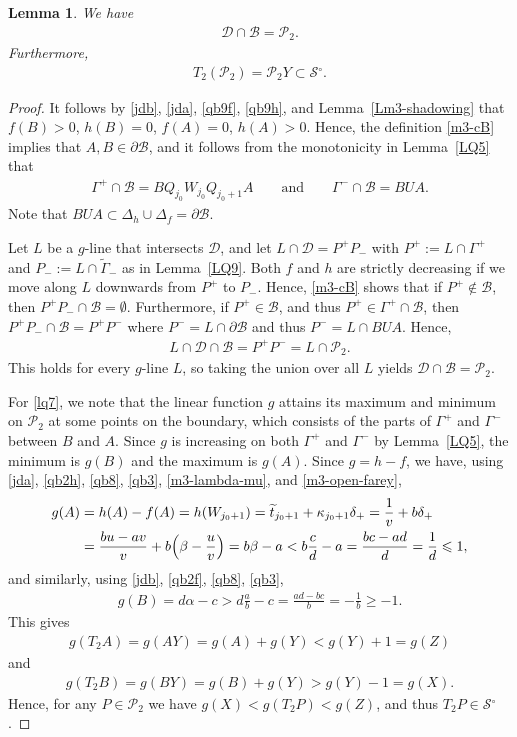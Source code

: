 \documentclass[11pt,reqno,tbtags,a4paper]{amsart}
\numberwithin{equation}{section}
\renewcommand\le{\leq}
\renewcommand\ge{\geq}
\renewcommand\leq{\leqslant}
\renewcommand\geq{\geqslant}
\theoremstyle{plain}%
\newtheorem{lemma}[theorem]{Lemma}
\theoremstyle{definition}
\theoremstyle{remark}
\newcommand{\refL}[1]{Lemma~\ref{#1}}
\newcommand\Bigpar[1]{\Bigl(#1\Bigr)}
\newcommand\inter{\ensuremath{^\circ}}
\newcommand\ga{\alpha}
\newcommand\gb{\beta}
\newcommand\gD{\Delta}
\newcommand\gG{\Gamma}
\newcommand\kk{\kappa}
\newcommand\cB{\mathcal B}
\newcommand\cD{\mathcal D}
\newcommand\cP{\mathcal P}
\newcommand\cS{{\mathcal S}}
\newcommand\tgG{\widetilde{\gG}}
\newcommand\ttt{\widetilde t}
\newcommand\0{{\boldsymbol 0}}
\newcommand\1{{\boldsymbol 1}}
\begin{document}
\begin{lemma}\label{LQ7}
  We have 
  \begin{align}\label{lq70}
\cD\cap\cB = \cP_2.
  \end{align}
Furthermore, 
  \begin{align}\label{lq7}
T_2(\cP_2)=\cP_2Y\subset\cS\inter.    
  \end{align}
\end{lemma}
\begin{proof}
It follows by \eqref{jdb}, \eqref{jda}, \eqref{qb9f}, \eqref{qb9h}, and 
\refL{Lm3-shadowing} that $f(B)>0$, $h(B)=0$, $f(A)=0$, $h(A)>0$.
Hence, the definition \eqref{m3-cB} implies that
$A,B\in\partial\cB$, and it follows from the monotonicity in \refL{LQ5}
that
\begin{align}\label{lq77}
  \gG^+\cap\cB=B Q_{j_0} W_{j_0} Q_{j_0+1} A
\qquad\text{and}\qquad
  \gG^-\cap\cB=B U A.
\end{align}
Note that $BUA \subset \gD_h\cup\gD_f=\partial\cB$.

Let $L$ be a $g$-line that intersects $\cD$, and let $L\cap\cD=P^+P_-$ with
$P^+:=L\cap\gG^+$ and
$P_-:=L\cap\tgG_-$ as in \refL{LQ9}.
Both $f$ and $h$ are strictly decreasing if we move along $L$
downwards from $P^+$ to $P_-$. 
Hence, \eqref{m3-cB} shows that if $P^+\notin\cB$, then
$P^+P_-\cap\cB=\emptyset$. Furthermore, if $P^+\in\cB$, 
and thus $P^+\in\gG^+\cap\cB$, 
then $P^+P_-\cap\cB=P^+P^-$ where $P^-=L\cap\partial\cB$
and thus $P^-=L\cap BUA$. Hence, 
\begin{align}\label{qd1}
L\cap\cD\cap\cB=P^+P^-=L\cap\cP_2.  
\end{align}
This holds for every $g$-line $L$, so taking the union over all $L$ yields
$\cD\cap \cB=\cP_2$.

For \eqref{lq7}, we note that
the linear function $g$ attains its maximum and minimum on $\cP_2$ at 
some points
on the boundary, which consists of the parts of $\gG^+$ and $\gG^-$ between
$B$ and $A$. Since $g$ is increasing on both $\gG^+$ and $\gG^-$ by
\refL{LQ5}, the minimum is $g(B)$ and the maximum is $g(A)$.
Since $g=h-f$, we have, 
using  \eqref{jda}, \eqref{qb2h}, \eqref{qb8}, \eqref{qb3},
\eqref{m3-lambda-mu},
and \eqref{m3-open-farey},
\begin{align}\label{qc4}
  g(A) &
=h(A) -f(A)
=h(W_{j_0+1})
=\ttt_{j_0+1}+\kk_{j_0+1}\delta_+
=\frac1v+b\delta_+
\notag\\&
=\frac{bu-av}v+b\Bigpar{\gb-\frac uv}
=b\gb-a
<b\frac cd - a
=\frac{bc-ad}{d}=\frac{1}d
\le 1,
\end{align}
and similarly, using \eqref{jdb}, \eqref{qb2f}, \eqref{qb8}, \eqref{qb3},
%
\begin{align}\label{qc5}
  g(B) 
%
%
%
%
%
=d\ga-c
>d\frac{a}{b}-c
=\frac{ad-bc}b=-\frac{1}{b}\ge-1.
\end{align}
%
This gives
\begin{align}\label{qc6}
g(T_2A)=g(AY)=g(A)+g(Y)<g(Y)+1=g(Z)
\end{align}
and
\begin{align}\label{qc7}
g(T_2B)=g(BY)=g(B)+g(Y)>g(Y)-1=g(X).
\end{align}
Hence, for any $P\in\cP_2$ we have  $g(X)<g(T_2P)<g(Z)$, and thus
$T_2P\in\cS\inter$.
\end{proof}
\end{document}
